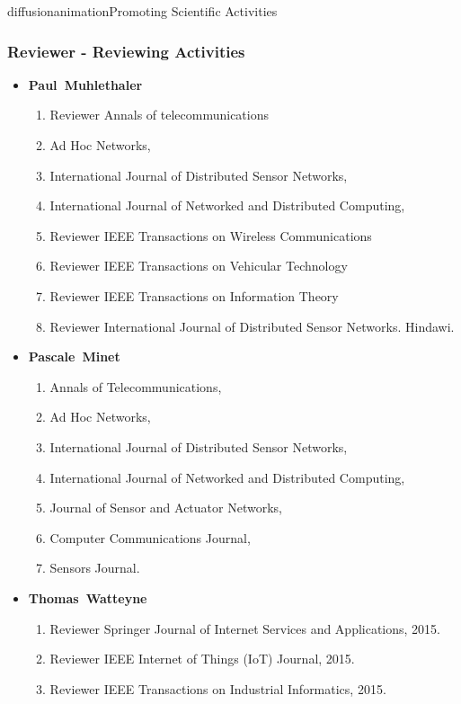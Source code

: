 \documentclass{ra2016}
\newcommand{\paul}  {\textbf{Paul~Muhlethaler}}
\newcommand{\pascale} {\textbf{Pascale~Minet}}
\newcommand{\thomas}  {\textbf{Thomas~Watteyne}}
\begin{document}
\begin{module}{diffusion}{animation}{Promoting Scientific Activities}
    
    \subsubsection{Reviewer - Reviewing Activities}
 
       \begin{itemize}
    \item \paul
        \begin{enumerate}
            \item Reviewer Annals of telecommunications
            \item Ad Hoc Networks,
            \item International Journal of Distributed Sensor Networks,
            \item International Journal of Networked and Distributed Computing,
            \item Reviewer IEEE Transactions on Wireless Communications
            \item Reviewer IEEE Transactions on Vehicular Technology
            \item Reviewer IEEE Transactions on Information Theory
            \item Reviewer International Journal of Distributed Sensor Networks. Hindawi. 
        \end{enumerate}
    \item \pascale
        \begin{enumerate}
           \item Annals of Telecommunications,
		\item Ad Hoc Networks,
		\item International Journal of Distributed Sensor Networks,
		\item International Journal of Networked and Distributed Computing,
		\item Journal of Sensor and Actuator Networks,
		\item Computer Communications Journal,
		\item Sensors Journal.
        \end{enumerate}
    \item \thomas
        \begin{enumerate}
            \item Reviewer Springer Journal of Internet Services and Applications, 2015.
            \item Reviewer IEEE Internet of Things (IoT) Journal, 2015.
            \item Reviewer IEEE Transactions on Industrial Informatics, 2015.

\end{enumerate}
\end{itemize}
\end{module}
\end{document}
